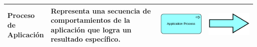 {\begin{longtable}{|p{0.15\linewidth}|p{0.45\linewidth}|p{0.2\linewidth} p{0.2\linewidth}|}
    	Proceso de Aplicación 
    	&
    	Representa una secuencia de comportamientos de la aplicación que logra un resultado específico. 
    	&
    	\begin{center}
    		\includegraphics[width=1\linewidth]{imgs/aplication_process.pdf}
    	\end{center} &
    	\begin{center}
    		\includegraphics[width=0.7\linewidth]{imgs/process.pdf}
    	\end{center}
    	\\ \hline
    	

\end{longtable}}
